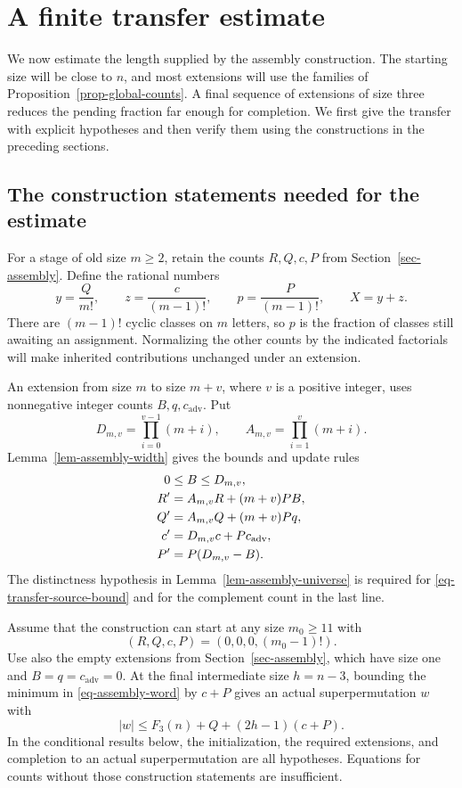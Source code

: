 \section{A finite transfer estimate}
\label{sec-finite-transfer}

We now estimate the length supplied by the assembly construction. The
starting size will be close to $n$, and most extensions will use the
families of Proposition~\ref{prop-global-counts}. A final sequence of
extensions of size three reduces the pending fraction far enough for
completion. We first give the transfer with explicit hypotheses and then
verify them using the constructions in the preceding sections.

\subsection{The construction statements needed for the estimate}

For a stage of old size $m\ge2$, retain the counts $R,Q,c,P$ from
Section~\ref{sec-assembly}. Define the rational numbers
\[
 y=\frac{Q}{m!},\qquad
 z=\frac{c}{(m-1)!},\qquad
 p=\frac{P}{(m-1)!},\qquad X=y+z.
\]
There are $(m-1)!$ cyclic classes on $m$ letters, so $p$ is the fraction
of classes still awaiting an assignment. Normalizing the other counts by
the indicated factorials will make inherited contributions unchanged
under an extension.

An extension from size $m$ to size $m+v$, where $v$ is a positive integer,
uses nonnegative integer counts $B,q,c_{\mathrm{adv}}$. Put
\[
 D_{m,v}=\prod_{i=0}^{v-1}(m+i),\qquad
 A_{m,v}=\prod_{i=1}^{v}(m+i).
\]
Lemma~\ref{lem-assembly-width} gives the bounds and update rules
\begin{align}
 0&\le B\le D_{m,v}, \label{eq-transfer-source-bound}\\
 R'&=A_{m,v}R+(m+v)PB,\notag\\
 Q'&=A_{m,v}Q+(m+v)Pq,\notag\\
 c'&=D_{m,v}c+Pc_{\mathrm{adv}},\notag\\
 P'&=P(D_{m,v}-B). \label{eq-transfer-integer-update}
\end{align}
The distinctness hypothesis in Lemma~\ref{lem-assembly-universe} is
required for \eqref{eq-transfer-source-bound} and for the complement
count in the last line.

Assume that the construction can start at any size $m_0\ge11$ with
\[
 (R,Q,c,P)=(0,0,0,(m_0-1)!).
\]
Use also the empty extensions from Section~\ref{sec-assembly}, which have
size one and $B=q=c_{\mathrm{adv}}=0$. At the final intermediate size
$h=n-3$, bounding the minimum in \eqref{eq-assembly-word} by $c+P$
gives an actual superpermutation $w$ with
\begin{equation}
 |w|\le F_3(n)+Q+(2h-1)(c+P).
 \label{eq-transfer-word-input}
\end{equation}
In the conditional results below, the initialization, the required
extensions, and completion to an actual superpermutation are all hypotheses. Equations
for counts without those construction statements are insufficient.

